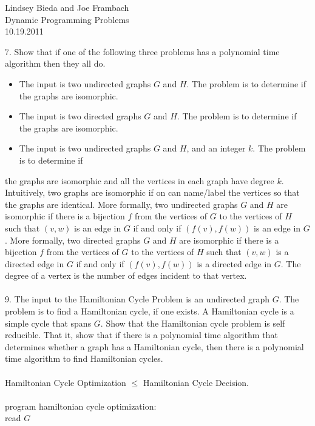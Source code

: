 \documentclass[10pt]{article}
\newcommand{\tab}{\hspace*{2em}}
\begin{document}
	\begin{flushright}
	Lindsey Bieda and Joe Frambach\\
	Dynamic Programming Problems\\
	10.19.2011
	\end{flushright}
		7. Show that if one of the following three problems has a polynomial time algorithm then they all do.
		\begin{itemize}
		\item The input is two undirected graphs $G$ and $H$. The problem is to determine if the graphs are
		isomorphic.
		\item The input is two directed graphs $G$ and $H$. The problem is to determine if the graphs are
		isomorphic.
		\item The input is two undirected graphs $G$ and $H$, and an integer $k$. The problem is to determine if
		\end{itemize}
		the graphs are isomorphic and all the vertices in each graph have degree $k$.
		Intuitively, two graphs are isomorphic if on can name/label the vertices so that the graphs are identical.
		More formally, two undirected graphs $G$ and $H$ are isomorphic if there is a bijection $f$ from the vertices
		of $G$ to the vertices of $H$ such that $(v, w)$ is an edge in $G$ if and only if $(f (v), f (w))$ is an edge in $G$.
		More formally, two directed graphs $G$ and $H$ are isomorphic if there is a bijection $f$ from the vertices
		of $G$ to the vertices of $H$ such that $(v, w)$ is a directed edge in $G$ if and only if $(f (v), f (w))$ is a directed
		edge in $G$. The degree of a vertex is the number of edges incident to that vertex.
		\\
		\\
		9. The input to the Hamiltonian Cycle Problem is an undirected graph $G$. The problem is to find a
		Hamiltonian cycle, if one exists. A Hamiltonian cycle is a simple cycle that spans $G$. Show that the
		Hamiltonian cycle problem is self reducible. That it, show that if there is a polynomial time algorithm
		that determines whether a graph has a Hamiltonian cycle, then there is a polynomial time algorithm
		to find Hamiltonian cycles.
		\\
		\\
		Hamiltonian Cycle Optimization $\leq$ Hamiltonian Cycle Decision.\\
		\\
		program hamiltonian cycle optimization:\\
		\tab read $G$\\
\end{document}
